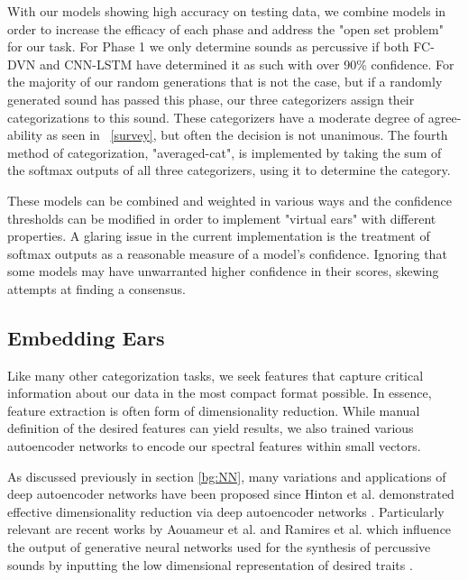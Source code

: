 \documentclass[\main/thesis.tex]{subfiles}
\begin{document}
With our models showing high accuracy on testing data, we combine models in order to increase the efficacy of each phase and address the "open set problem" for our task. For Phase 1 we only determine sounds as percussive if both FC-DVN and CNN-LSTM have determined it as such with over 90\% confidence. For the majority of our random generations that is not the case, but if a randomly generated sound has passed this phase, our three categorizers assign their categorizations to this sound. These categorizers have a moderate degree of agree-ability as seen in ~\ref{survey}, but often the decision is not unanimous. The fourth method of categorization, "averaged-cat", is implemented by taking the sum of the softmax outputs of all three categorizers, using it to determine the category. 

These models can be combined and weighted in various ways and the confidence thresholds can be modified in order to implement "virtual ears" with different properties. A glaring issue in the current implementation is the treatment of softmax outputs as a reasonable measure of a model's confidence. Ignoring that some models may have unwarranted higher confidence in their scores, skewing attempts at finding a consensus. 


\subsection{Embedding Ears}
% 
Like many other categorization tasks, we seek features that capture critical information about our data in the most compact format possible. In essence, feature extraction is often form of dimensionality reduction. While manual definition of the desired features can yield results, we also trained various autoencoder networks to encode our spectral features within small vectors. 

As discussed previously in section \ref{bg:NN}, many variations and applications of deep autoencoder networks have been proposed since Hinton et al. demonstrated effective dimensionality reduction via deep autoencoder networks \cite{hinton1994autoencoders,hinton2006reducing}. Particularly relevant are recent works by Aouameur et al. and Ramires et al. which influence the output of generative neural networks used for the synthesis of percussive sounds by inputting the low dimensional representation of desired traits \cite{aouameur2019neural,ramires2020timbfeat}. 
\end{document}
